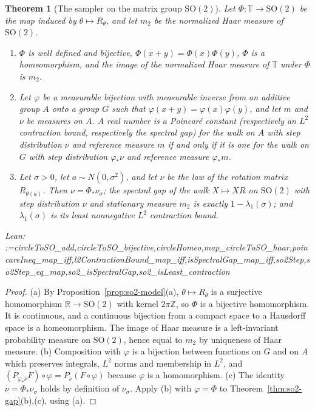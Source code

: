 \documentclass[11pt]{amsart}
\makeatletter
\newtheorem{theorem}{Theorem}[section]
\theoremstyle{definition}
\theoremstyle{remark}
\newcommand{\@leanlist}[1]{\def\@leansep{}\@for\@leanname:=#1\do{\@leansep
  \texttt{\expandafter\detokenize\expandafter{\@leanname}}\def\@leansep{, }}}
\newcommand{\lean}[1]{\par\smallskip\noindent
  {\footnotesize\normalfont\raggedright\textsf{Lean:} \@leanlist{#1}\par}}
\newcommand{\R}{\mathbb{R}}
\newcommand{\Z}{\mathbb{Z}}
\newcommand{\T}{\mathbb{T}}
\newcommand{\SO}{\mathrm{SO}}
\makeatother
\begin{document}
\begin{theorem}[The sampler on the matrix group $\SO(2)$]\label{thm:so2-matrix}
Let $\Phi\colon\T\to\SO(2)$ be the map induced by $\theta\mapsto R_\theta$, and let $m_2$ be the
normalized Haar measure of $\SO(2)$.
\begin{enumerate}
\item[(a)] $\Phi$ is well defined and bijective, $\Phi(x+y)=\Phi(x)\Phi(y)$, $\Phi$ is a
homeomorphism, and the image of the normalized Haar measure of $\T$ under $\Phi$ is $m_2$.
\item[(b)] Let $\varphi$ be a measurable bijection with measurable inverse from an additive group
$A$ onto a group $G$ such that $\varphi(x+y)=\varphi(x)\varphi(y)$, and let $m$ and $\nu$ be
measures on $A$.  A real number is a Poincar\'e constant (respectively an $L^2$ contraction
bound, respectively the spectral gap) for the walk on $A$ with step distribution $\nu$ and
reference measure $m$ if and only if it is one for the walk on $G$ with step distribution
$\varphi_*\nu$ and reference measure $\varphi_*m$.
\item[(c)] Let $\sigma>0$, let $a\sim N(0,\sigma^2)$, and let $\nu$ be the law of the rotation
matrix $R_{\theta(a)}$.  Then $\nu=\Phi_*\nu_\sigma$; the spectral gap of the walk
$X\mapsto XR$ on $\SO(2)$ with step distribution $\nu$ and stationary measure $m_2$ is exactly
$1-\lambda_1(\sigma)$; and $\lambda_1(\sigma)$ is its least nonnegative $L^2$ contraction bound.
\end{enumerate}
\lean{circleToSO_add,circleToSO_bijective,circleHomeo,map_circleToSO_haar,poincareIneq_map_iff,l2ContractionBound_map_iff,isSpectralGap_map_iff,so2Step,so2Step_eq_map,so2_isSpectralGap,so2_isLeast_contraction}
\end{theorem}

\begin{proof}
(a) By Proposition~\ref{prop:so2-model}(a), $\theta\mapsto R_\theta$ is a surjective homomorphism
$\R\to\SO(2)$ with kernel $2\pi\Z$, so $\Phi$ is a bijective homomorphism.  It is continuous, and
a continuous bijection from a compact space to a Hausdorff space is a homeomorphism.  The image
of Haar measure is a left-invariant probability measure on $\SO(2)$, hence equal to $m_2$ by
uniqueness of Haar measure.  (b) Composition with $\varphi$ is a bijection between functions on
$G$ and on $A$ which preserves integrals, $L^2$ norms and membership in $L^2$, and
$(P_{\varphi_*\nu}F)\circ\varphi=P_\nu(F\circ\varphi)$ because $\varphi$ is a homomorphism.
(c) The identity $\nu=\Phi_*\nu_\sigma$ holds by definition of $\nu_\sigma$.  Apply (b) with
$\varphi=\Phi$ to Theorem~\ref{thm:so2-gap}(b),(c), using (a).
\end{proof}
\end{document}

